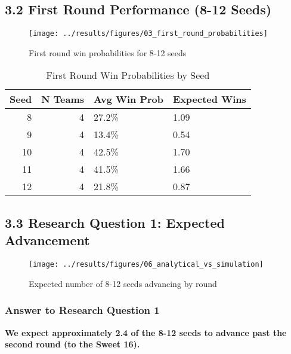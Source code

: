 \documentclass[
]{article}
\begin{document}
\subsection{3.2 First Round Performance (8-12
Seeds)}\label{first-round-performance-8-12-seeds}

\begin{figure}

{\centering \texttt{[image: ../results/figures/03\_first\_round\_probabilities]} 

}

\caption{First round win probabilities for 8-12 seeds}\label{fig:first-round-plot}
\end{figure}

\begin{longtable}[t]{rrll}
\caption{\label{tab:first-round-table}First Round Win Probabilities by Seed}\\
\toprule
Seed & N Teams & Avg Win Prob & Expected Wins\\
\midrule
8 & 4 & 27.2\% & 1.09\\
9 & 4 & 13.4\% & 0.54\\
10 & 4 & 42.5\% & 1.70\\
11 & 4 & 41.5\% & 1.66\\
12 & 4 & 21.8\% & 0.87\\
\bottomrule
\end{longtable}

\subsection{3.3 Research Question 1: Expected
Advancement}\label{research-question-1-expected-advancement}

\begin{figure}

{\centering \texttt{[image: ../results/figures/06\_analytical\_vs\_simulation]} 

}

\caption{Expected number of 8-12 seeds advancing by round}\label{fig:advancement-plot}
\end{figure}

\subsubsection{Answer to Research Question
1}\label{answer-to-research-question-1}

\textbf{We expect approximately 2.4 of the 8-12 seeds to advance past
the second round (to the Sweet 16).}
\end{document}
